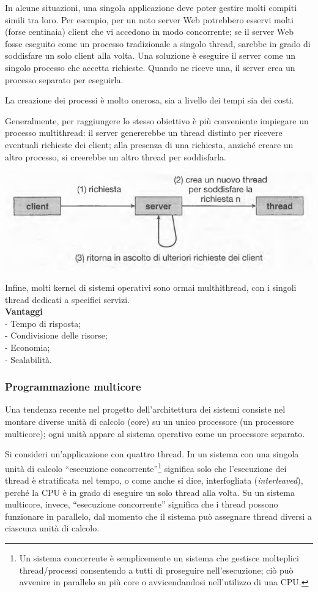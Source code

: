 \documentclass[11pt,a4paper]{article}
\begin{document}
In alcune situazioni, una singola applicazione deve poter gestire molti compiti simili tra lo­ro. Per esempio, per un noto server Web potrebbero esservi molti (forse centinaia) client che vi acce­dono in modo concorrente; se il server Web fosse eseguito come un processo tradizionale a
singolo thread, sarebbe in grado di soddisfare un solo client alla volta. Una soluzione è eseguire il server come un singolo processo che accetta richieste.
Quando ne riceve una, il server crea un processo separato per eseguirla.

La creazione dei processi è molto onerosa, sia a livello dei tempi sia dei co­sti.

Generalmente, per
raggiungere lo stesso obiettivo è più conveniente impiegare un processo multithread:
il server genererebbe un thread distinto per ricevere eventuali richieste dei client;
alla presenza di una richiesta, anziché creare un altro processo, si creerebbe un altro thread
per soddisfarla.
\begin{center}
  \includegraphics[scale=0.45]{img/0011.png}
\end{center}
Infine, molti kernel di sistemi operativi sono ormai multhithread, con i singoli thread
dedicati a specifici servizi.\medskip\\
\textbf{Vantaggi}\\
- Tempo di risposta;\\
- Condivisione delle risorse;\\
- Economia;\\
- Scalabilità.

\subsubsection{Programmazione multicore}
Una tendenza recente nel progetto dell'architettura dei sistemi consiste nel montare diverse
unità di calcolo (core) su un unico processore (un processore multicore); ogni unità appare al
sistema operativo come un processore separato.

Si consideri un'applicazione con quattro thread. In un sistema
con una singola unità di calcolo “esecuzione concorrente”\footnote{Un sistema concorrente è semplicemente un sistema che gestisce molteplici thread/processi consentendo a tutti di proseguire nell'esecuzione; ciò può avvenire in parallelo su più core o avvicendandosi nell'utilizzo di una CPU.} significa solo che l'esecuzione dei
thread è stratificata nel tempo, o come anche si dice, interfogliata (\emph{interleaved}),
perché la CPU è in grado di eseguire un solo thread alla volta. Su un sistema multicore, inve­ce, “esecuzione concorrente” significa che i thread possono funzionare in parallelo, dal mo­mento che il sistema può assegnare thread diversi a ciascuna unità di calcolo.
\end{document}
